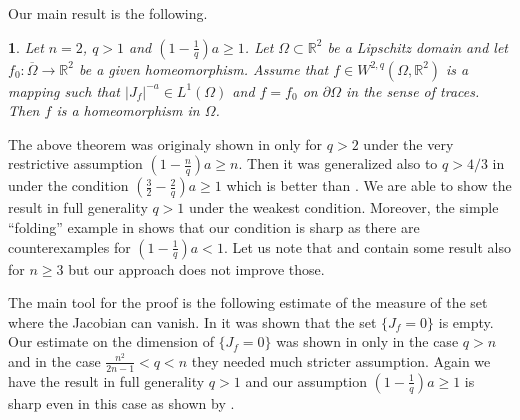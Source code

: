 \documentclass[12pt,a4paper]{amsart}
\theoremstyle{plain}
\newtheorem{proclaim}[thm]{\the\prt}
\theoremstyle{definition}
\numberwithin{equation}{section}
\def\er{\mathbb R}
\begin{document}
Our main result is the following. 

\begin{proclaim}
\label{main}
Let $n=2$, $q> 1$ and $(1-\frac{1}{q})a\geq 1$. 
Let $\Omega\subset\er^2$ be a Lipschitz domain and let $f_0:\overline{\Omega}\to\er^2$ be a given homeomorphism. 
Assume that $f\in W^{2,q}(\Omega,\er^2)$ is a mapping such that $|J_f|^{-a}\in L^1(\Omega)$ and $f=f_0$ on $\partial \Omega$ in the sense of traces. 
Then $f$ is a homeomorphism in $\Omega$. 
\end{proclaim}


The above theorem was originaly shown in \cite{HK} only for $q>2$ under the very restrictive assumption $(1-\frac{n}{q})a\geq n$. Then it was generalized also to $q>4/3$ in \cite{CHMS} under the condition $(\frac{3}{2}-\frac{2}{q})a\geq 1$ which is better than \cite{HK}. We are able to show the result in full generality $q> 1$ under the weakest condition.  
Moreover, the simple ``folding'' example in \cite[Example 5.1]{CHMS} shows that our condition is sharp as there are counterexamples for $(1-\frac{1}{q})a< 1$. 
Let us note that \cite{HK} and \cite[Theorem 1.2]{CHMS} contain some result also for $n\geq 3$ but our approach does not improve those. 


The main tool for the proof is the following estimate of the measure of the set where the Jacobian can vanish. 
In \cite{HK} it was shown that the set $\{J_f=0\}$ is empty. Our estimate on the dimension of $\{J_f=0\}$ was shown in \cite[Theorem 1.3 and Corollary 1.4]{CHMS} only in the case $q>n$ and in the case 
$\frac{n^2}{2n-1}<q<n$ they needed much stricter assumption. Again we have the result in full generality $q> 1$ and our assumption $(1-\frac{1}{q})a\geq 1$ is sharp even in this case as shown by \cite[Example 5.1]{CHMS}. 

\end{document}
